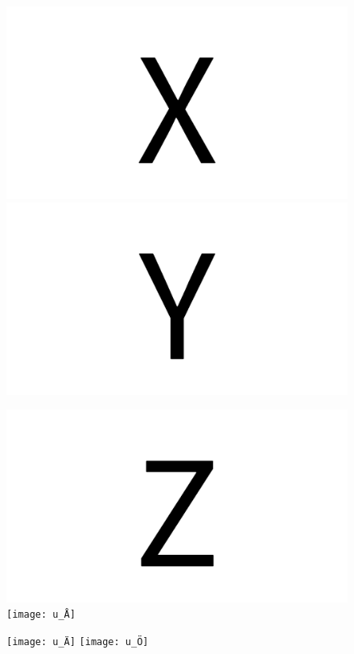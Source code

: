 \documentclass{article}
\begin{document}
\begin{figure}[H]
  \includegraphics[width=\linewidth]{u_X}
\endminipage\hfill
{}
  \includegraphics[width=\linewidth]{u_Y}
\endminipage\hfill
\end{figure}

\begin{figure}[H]
  \includegraphics[width=\linewidth]{u_Z}
\endminipage\hfill
{}
  \texttt{[image: u\_Å]}
\endminipage\hfill
\end{figure}

\begin{figure}[H]
  \texttt{[image: u\_Ä]}
\endminipage\hfill
{}
  \texttt{[image: u\_Ö]}
\endminipage\hfill
\end{figure}
\end{document}
